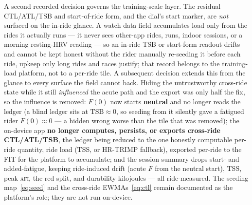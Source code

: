 \documentclass[11pt]{article}
\newcommand{\afi}{\textup{\textsc{afi}}}
\newcommand{\Fstate}{\ensuremath{F}}
\begin{document}
A second recorded decision governs the training-scale layer. The residual CTL/ATL/TSB and start-of-ride form, and the dial's start marker, are \emph{not} surfaced on the in-ride glance. A watch data field accumulates load only from the rides it actually runs --- it never sees other-app rides, runs, indoor sessions, or a morning resting-HRV reading --- so an in-ride TSB or start-form readout drifts and cannot be kept honest without the rider manually re-seeding it before each ride, upkeep only long rides and races justify; that record belongs to the training-load platform, not to a per-ride tile. A subsequent decision extends this from the glance to every surface the field cannot back. Hiding the untrustworthy cross-ride state while it still \emph{influenced} the acute path and the export was only half the fix, so the influence is removed: $\Fstate(0)$ now starts \textbf{neutral} and no longer reads the ledger (a blind ledger sits at $\text{TSB}\approx0$, so seeding from it silently gave a fatigued rider $\Fstate(0)\approx0$ --- a hidden wrong worse than the tile that was removed); the on-device app \textbf{no longer computes, persists, or exports cross-ride CTL/ATL/TSB}, the ledger being reduced to the one honestly computable per-ride quantity, ride load (TSS, or HR-TRIMP fallback), exported per-ride to the FIT for the platform to accumulate; and the session summary drops start- and added-fatigue, keeping ride-induced drift (acute $\Fstate$ from the neutral start), TSS, peak \afi{}, the red split, and durability kilojoules --- all ride-measured. The seeding map~\eqref{eq:seed} and the cross-ride EWMAs~\eqref{eq:ctl} remain documented as the platform's role; they are not run on-device.
\end{document}
